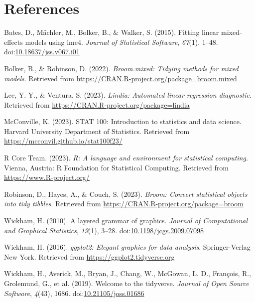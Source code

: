 \documentclass[10pt,a4paper,onecolumn]{article}
\newlength{\cslhangindent}
\newlength{\cslentryspacingunit} %
\newenvironment{CSLReferences}[2] %
 {%
  \setlength{\parindent}{0pt}
  \ifodd #1
  \let\oldpar\par
  \def\par{\hangindent=\cslhangindent\oldpar}
  \fi
  \setlength{\parskip}{#2\cslentryspacingunit}
 }%
 {}
\begin{document}
\hypertarget{references}{%
\section*{References}\label{references}}

\hypertarget{refs}{}
\begin{CSLReferences}{1}{0}
\leavevmode{}%
Bates, D., Mächler, M., Bolker, B., \& Walker, S. (2015). Fitting linear
mixed-effects models using {lme4}. \emph{Journal of Statistical
Software}, \emph{67}(1), 1--48.
doi:\href{https://doi.org/10.18637/jss.v067.i01}{10.18637/jss.v067.i01}

\leavevmode{}%
Bolker, B., \& Robinson, D. (2022). \emph{Broom.mixed: Tidying methods
for mixed models}. Retrieved from
\url{https://CRAN.R-project.org/package=broom.mixed}

\leavevmode{}%
Lee, Y. Y., \& Ventura, S. (2023). \emph{Lindia: Automated linear
regression diagnostic}. Retrieved from
\url{https://CRAN.R-project.org/package=lindia}

\leavevmode{}%
McConville, K. (2023). STAT 100: Introduction to statistics and data
science. Harvard University Department of Statistics. Retrieved from
\url{https://mcconvil.github.io/stat100f23/}

\leavevmode{}%
R Core Team. (2023). \emph{R: A language and environment for statistical
computing}. Vienna, Austria: R Foundation for Statistical Computing.
Retrieved from \url{https://www.R-project.org/}

\leavevmode{}%
Robinson, D., Hayes, A., \& Couch, S. (2023). \emph{Broom: Convert
statistical objects into tidy tibbles}. Retrieved from
\url{https://CRAN.R-project.org/package=broom}

\leavevmode{}%
Wickham, H. (2010). A layered grammar of graphics. \emph{Journal of
Computational and Graphical Statistics}, \emph{19}(1), 3--28.
doi:\href{https://doi.org/10.1198/jcgs.2009.07098}{10.1198/jcgs.2009.07098}

\leavevmode{}%
Wickham, H. (2016). \emph{ggplot2: Elegant graphics for data analysis}.
Springer-Verlag New York. Retrieved from
\url{https://ggplot2.tidyverse.org}

\leavevmode{}%
Wickham, H., Averick, M., Bryan, J., Chang, W., McGowan, L. D.,
François, R., Grolemund, G., et al. (2019). Welcome to the {tidyverse}.
\emph{Journal of Open Source Software}, \emph{4}(43), 1686.
doi:\href{https://doi.org/10.21105/joss.01686}{10.21105/joss.01686}

\end{CSLReferences}
\end{document}
